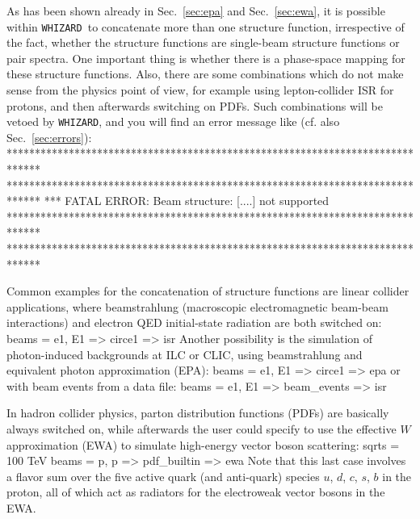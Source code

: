 \documentclass[12pt]{book}
\newenvironment{interaction}%
  {\begingroup\small
   \Verbatim}%
  {\endVerbatim
   \endgroup\noindent}
\newenvironment{code}%
  {\begingroup\footnotesize
   \quote
   \Verbatim}%
  {\endVerbatim
   \endquote
   \endgroup\noindent}
\newcommand{\ttt}[1]{\texttt{#1}}
\newcommand{\whizard}{\ttt{WHIZARD}}
\begin{document}
As has been shown already in Sec.~\ref{sec:epa} and
Sec.~\ref{sec:ewa}, it is possible within \whizard\ to concatenate
more than one structure function, irrespective of the fact, whether
the structure functions are single-beam structure functions or pair
spectra. One important thing is whether there is a phase-space mapping
for these structure functions. Also, there are some combinations which
do not make sense from the physics point of view, for example using
lepton-collider ISR for protons, and then afterwards switching on
PDFs. Such combinations will be vetoed by \whizard, and you will find
an error message like (cf. also Sec.~\ref{sec:errors}):
\begin{interaction}
******************************************************************************
******************************************************************************
*** FATAL ERROR: Beam structure: [....] not supported
******************************************************************************
******************************************************************************
\end{interaction}

Common examples for the concatenation of structure functions are
linear collider applications, where beamstrahlung (macroscopic
electromagnetic beam-beam interactions) and electron QED initial-state
radiation are both switched on:
\begin{code}
beams = e1, E1 => circe1 => isr
\end{code}
Another possibility is the simulation of photon-induced backgrounds at
ILC or CLIC, using beamstrahlung and equivalent photon approximation
(EPA):
\begin{code}
beams = e1, E1 => circe1 => epa
\end{code}
or with beam events from a data file:
\begin{code}
beams = e1, E1 => beam_events => isr
\end{code}

In hadron collider physics, parton distribution functions (PDFs) are
basically always switched on, while afterwards the user could specify
to use the effective $W$ approximation (EWA) to simulate high-energy
vector boson scattering:
\begin{code}
sqrts = 100 TeV
beams = p, p => pdf_builtin => ewa
\end{code}
Note that this last case involves a flavor sum over the five active
quark (and anti-quark) species $u$, $d$, $c$, $s$, $b$ in the proton,
all of which act as radiators for the electroweak vector bosons in the
EWA.
\end{document}
